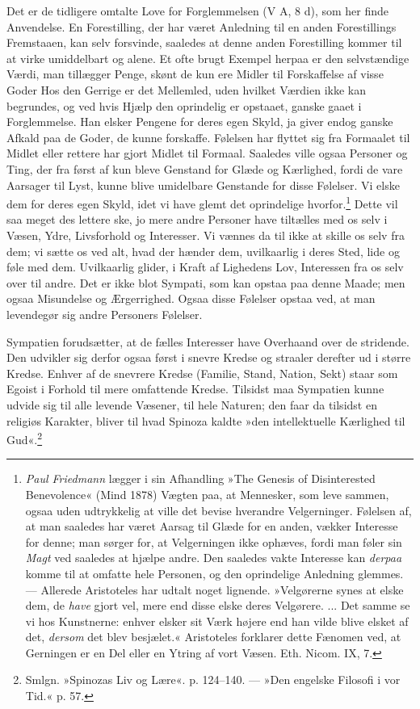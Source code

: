 \documentclass[12pt,a4paper,openany]{book}
\newcommand{\opage}[1]{\marginnote{\footnotesize\textit{[#1]}}}
\begin{document}
Det er de tidligere omtalte Love for Forglemmelsen (V A, 8 d), som her
finde Anvendelse. En Forestilling, der har været Anledning til en anden
Forestillings Fremstaaen, kan selv forsvinde, saaledes at denne anden
Forestilling kommer til at virke umiddelbart og alene. Et ofte brugt
Exempel herpaa er den selvstændige Værdi, man tillægger Penge, skønt de
kun ere Midler til Forskaffelse af visse Goder Hos den Gerrige er det
Mellemled, uden hvilket Værdien ikke kan begrundes, og ved hvis Hjælp
den oprindelig er opstaaet, ganske gaaet i Forglemmelse. Han elsker
Pengene for deres egen Skyld, ja giver endog ganske Afkald paa de Goder,
de kunne forskaffe. Følelsen har flyttet sig fra Formaalet til Midlet
eller rettere har gjort Midlet til Formaal. Saaledes ville ogsaa
Personer og Ting, der fra først af kun bleve Genstand for Glæde og
Kærlighed, fordi de vare Aarsager til Lyst, kunne blive umidelbare
Genstande for disse Følelser. Vi elske dem for deres egen Skyld, idet vi
have glemt det oprindelige hvorfor.\footnote[2]{\emph{Paul Friedmann}
lægger i sin Afhandling »The Genesis of Disinterested Benevolence« (Mind
1878) Vægten paa, at Mennesker, som leve sammen, ogsaa uden udtrykkelig
at ville det bevise hverandre Velgerninger. Følelsen af, at man saaledes
har været Aarsag til Glæde for en anden, vækker Interesse for denne; man
sørger for, at Velgerningen ikke ophæves, fordi man føler sin
\emph{Magt} ved saaledes at hjælpe andre. Den saaledes vakte Interesse
kan \emph{derpaa} komme til at omfatte hele Personen, og den oprindelige
Anledning glemmes. --- Allerede Aristoteles har udtalt noget lignende.
»Velgørerne synes at elske dem, de \emph{have} gjort vel, mere end disse
elske deres Velgørere. ... Det samme se vi hos Kunstnerne: enhver elsker
sit Værk højere end han vilde blive elsket af det, \emph{dersom} det
blev besjælet.« Aristoteles forklarer dette Fænomen ved, at Gerningen er
en Del eller en Ytring af vort Væsen. Eth. Nicom. IX, 7.} Dette
\opage{295}vil saa meget des lettere ske, jo mere andre Personer have
tiltælles med os selv i Væsen, Ydre, Livsforhold og Interesser. Vi
vænnes da til ikke at skille os selv fra dem; vi sætte os ved alt, hvad
der hænder dem, uvilkaarlig i deres Sted, lide og føle med dem.
Uvilkaarlig glider, i Kraft af Lighedens Lov, Interessen fra os selv
over til andre. Det er ikke blot Sympati, som kan opstaa paa denne
Maade; men ogsaa Misundelse og Ærgerrighed. Ogsaa disse Følelser opstaa
ved, at man levendegør sig andre Personers Følelser.

Sympatien forudsætter, at de fælles Interesser have Overhaand over de
stridende. Den udvikler sig derfor ogsaa først i snevre Kredse og
straaler derefter ud i større Kredse. Enhver af de snevrere Kredse
(Familie, Stand, Nation, Sekt) staar som Egoist i Forhold til mere
omfattende Kredse. Tilsidst maa Sympatien kunne udvide sig til alle
levende Væsener, til hele Naturen; den faar da tilsidst en religiøs
Karakter, bliver til hvad Spinoza kaldte »den intellektuelle Kærlighed
til Gud«.\footnote[1]{Smlgn. »Spinozas Liv og Lære«. p. 124--140. ---
»Den engelske Filosofi i vor Tid.« p. 57.}
\end{document}
